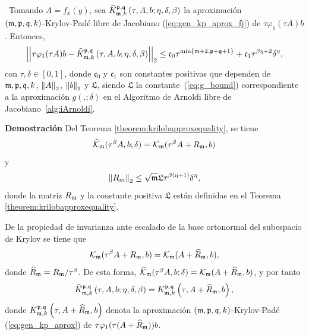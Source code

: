 \begin{theorem}\label{theorem:Krylov-fj-bound}
\cite{naranjo2023jacobian}~Tomando $A=f_x(y)$, sea $\widehat{K}_{\mathfrak{m},k}^{\mathfrak{p},\mathfrak{q}}\left(\tau, A , b ; \eta, \delta, \beta \right)$ la aproximación \\
	$(\mathfrak{m} , \mathfrak{p} ,\mathfrak{q} , k)$-Krylov-Padé libre de Jacobiano (\ref{eq:gen_kp_aprox_fj}) de $\tau \varphi_1(\tau A)b$. Entonces,
	\begin{equation}
		\left\lvert\left\lvert  \tau \varphi_1(\tau A)b -
		\widehat{K}_{\mf,k}^{\pf,\qf}\left( \tau, A , b ; \eta, \delta, \beta \right)\right\rvert\right\rvert_2%
		\leq \mathfrak{c}_0 \tau^{\min\{\mf+2,\pf+\qf+1\}} + \mathfrak{c}_1 \tau^{\beta\eta+2}\delta^{\eta},
	\end{equation}
	con $\tau,\delta \in [0,1]$, donde $\mathfrak{c}_0$ y $\mathfrak{c}_1$ son constantes positivas que dependen de $\mathfrak{m},\mathfrak{p},\mathfrak{q},k$, $\left\lVert A \right\rVert_2$, $\left\lVert b \right\rVert_2$ y $\mathfrak{L}$, siendo $\mathfrak{L}$ la constante~(\ref{eq:g_bound}) correspondiente a la aproximación $g(.;\delta)$ en el Algoritmo de Arnoldi libre de Jacobiano~\ref{alg:iArnoldi}.
\end{theorem}
\textbf{Demostración} Del Teorema \ref{theorem:krilobapproxequality}, se tiene
\[ \widehat{\mathcal{K}}_{\mathfrak{m}}(\tau^\beta A,b;\delta)=\mathcal{K}_{\mathfrak{m}}(\tau^\beta A+R_{\mathfrak{m}},b) \]
y
\begin{equation}
	\left\lVert R_m \right\rVert_2\leq \sqrt{\mathfrak{m}} \mathfrak{L} \tau^{\beta(\eta+1)}\delta^{\eta},  \label{eq:fjbound3}
\end{equation}
donde la matriz $R_{\mathfrak{m}}$ y la constante positiva $\mathfrak{L}$ están definidas en el Teorema \ref{theorem:krilobapproxequality}. 

De la propiedad de invarianza ante escalado de la base ortonormal del subespacio de Krylov se tiene que
\[ \mathcal{K}_{\mathfrak{m}}(\tau^\beta A+R_{\mathfrak{m}},b) = \mathcal{K}_{\mathfrak{m}}(A+\widehat{R}_{\mathfrak{m}},b), \]
donde $\widehat{R}_{\mathfrak{m}} = R_{\mathfrak{m}}/\tau^\beta$. De esta forma, $\widehat{\mathcal{K}}_{\mathfrak{m}}(\tau^\beta A,b;\delta)=\mathcal{K}_{\mathfrak{m}}(A+\widehat{R}_{\mathfrak{m}},b)$, y por tanto
\begin{equation}
	\widehat{K}_{\mathfrak{m},k}^{\mathfrak{p},\mathfrak{q}}\left( \tau, A , b; \eta, \delta, \beta \right) = K_{\mathfrak{m},k}^{\mathfrak{p},\mathfrak{q}}\left( \tau, A+\widehat{R}_{\mathfrak{m}} , b \right), \label{identidad}
\end{equation}
donde $K_{\mathfrak{m},k}^{\mathfrak{p},\mathfrak{q}}\left( \tau, A+\widehat{R}_{\mathfrak{m}} , b \right)$ denota la aproximación $(\mathfrak{m} , \mathfrak{p} ,\mathfrak{q} , k)$-Krylov-Padé (\ref{eq:gen_kp_aprox}) de $\tau \varphi_1(\tau (A+\widehat{R}_{\mathfrak{m}}))b$. 

